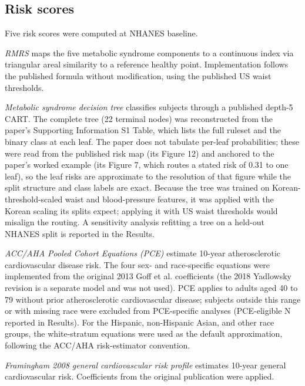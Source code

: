 \documentclass[11pt]{article}
\begin{document}
\subsection*{Risk scores}

Five risk scores were computed at NHANES baseline.

\emph{RMRS} \citep{shin2024rmrs} maps the five metabolic syndrome components to a continuous index via triangular areal similarity to a reference healthy point. Implementation follows the published formula without modification, using the published US waist thresholds.

\emph{Metabolic syndrome decision tree} \citep{shin2023b9} classifies subjects through a published depth-5 CART. The complete tree (22 terminal nodes) was reconstructed from the paper's Supporting Information S1 Table, which lists the full ruleset and the binary class at each leaf. The paper does not tabulate per-leaf probabilities; these were read from the published risk map (its Figure 12) and anchored to the paper's worked example (its Figure 7, which routes a stated risk of 0.31 to one leaf), so the leaf risks are approximate to the resolution of that figure while the split structure and class labels are exact. Because the tree was trained on Korean-threshold-scaled waist and blood-pressure features, it was applied with the Korean scaling its splits expect; applying it with US waist thresholds would misalign the routing. A sensitivity analysis refitting a tree on a held-out NHANES split is reported in the Results.

\emph{ACC/AHA Pooled Cohort Equations (PCE)} \citep{goff2014pce} estimate 10-year atherosclerotic cardiovascular disease risk. The four sex- and race-specific equations were implemented from the original 2013 Goff et al. coefficients (the 2018 Yadlowsky revision is a separate model and was not used). PCE applies to adults aged 40 to 79 without prior atherosclerotic cardiovascular disease; subjects outside this range or with missing race were excluded from PCE-specific analyses (PCE-eligible N reported in Results). For the Hispanic, non-Hispanic Asian, and other race groups, the white-stratum equations were used as the default approximation, following the ACC/AHA risk-estimator convention.

\emph{Framingham 2008 general cardiovascular risk profile} \citep{dagostino2008framingham} estimates 10-year general cardiovascular risk. Coefficients from the original publication were applied.
\end{document}
